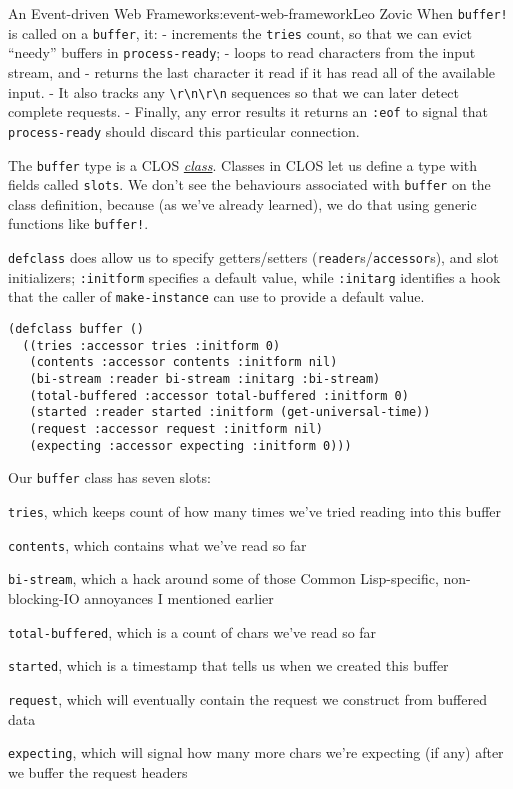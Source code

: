\begin{aosachapter}{An Event-driven Web Framework}{s:event-web-framework}{Leo Zovic}
When \texttt{buffer!} is called on a \texttt{buffer}, it: - increments
the \texttt{tries} count, so that we can evict ``needy'' buffers in
\texttt{process-ready}; - loops to read characters from the input
stream, and - returns the last character it read if it has read all of
the available input. - It also tracks any
\texttt{\textbackslash{}r\textbackslash{}n\textbackslash{}r\textbackslash{}n}
sequences so that we can later detect complete requests. - Finally, any
error results it returns an \texttt{:eof} to signal that
\texttt{process-ready} should discard this particular connection.

The \texttt{buffer} type is a CLOS
\href{http://www.gigamonkeys.com/book/object-reorientation-classes.html}{\emph{class}}.
Classes in CLOS let us define a type with fields called \texttt{slots}.
We don't see the behaviours associated with \texttt{buffer} on the class
definition, because (as we've already learned), we do that using generic
functions like \texttt{buffer!}.

\texttt{defclass} does allow us to specify getters/setters
(\texttt{reader}s/\texttt{accessor}s), and slot initializers;
\texttt{:initform} specifies a default value, while \texttt{:initarg}
identifies a hook that the caller of \newline \texttt{make-instance} can
use to provide a default value.

\begin{verbatim}
(defclass buffer ()
  ((tries :accessor tries :initform 0)
   (contents :accessor contents :initform nil)
   (bi-stream :reader bi-stream :initarg :bi-stream)
   (total-buffered :accessor total-buffered :initform 0)
   (started :reader started :initform (get-universal-time))
   (request :accessor request :initform nil)
   (expecting :accessor expecting :initform 0)))
\end{verbatim}

Our \texttt{buffer} class has seven slots:

\begin{aosaitemize}

\item
  \texttt{tries}, which keeps count of how many times we've tried
  reading into this buffer
\item
  \texttt{contents}, which contains what we've read so far
\item
  \texttt{bi-stream}, which a hack around some of those Common
  Lisp-specific, non-blocking-IO annoyances I mentioned earlier
\item
  \texttt{total-buffered}, which is a count of chars we've read so far
\item
  \texttt{started}, which is a timestamp that tells us when we created
  this buffer
\item
  \texttt{request}, which will eventually contain the request we
  construct from buffered data
\item
  \texttt{expecting}, which will signal how many more chars we're
  expecting (if any) after we buffer the request headers
\end{aosaitemize}


\end{aosachapter}
